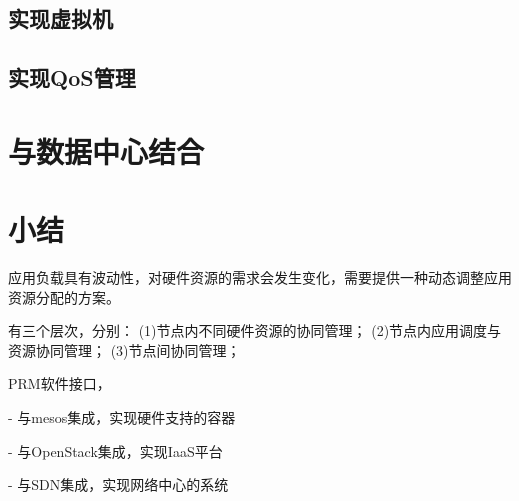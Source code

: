 \subsection{实现虚拟机}


\subsection{实现QoS管理}


\section{与数据中心结合}



\section{小结}


应用负载具有波动性，对硬件资源的需求会发生变化，需要提供一种动态调整应用资源分配的方案。

有三个层次，分别：
(1)节点内不同硬件资源的协同管理；
(2)节点内应用调度与资源协同管理；
(3)节点间协同管理；


PRM软件接口，

- 与mesos集成，实现硬件支持的容器

- 与OpenStack集成，实现IaaS平台

- 与SDN集成，实现网络中心的系统

